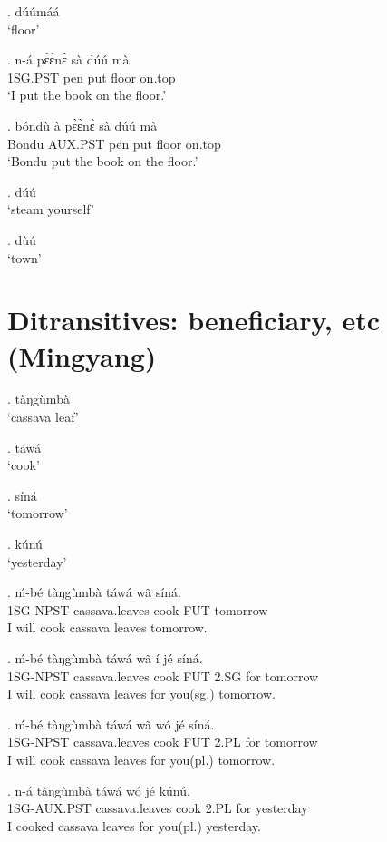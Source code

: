 \documentclass{assets/fieldnotes}
\begin{document}
\ex. dúúmáá \\
`floor'

\exg. n-á pɛ̀ɛ̀nɛ̀ sà dúú mà \\
1SG.PST pen put floor on.top \\
`I put the book on the floor.'

\exg. bóndù à pɛ̀ɛ̀nɛ̀ sà dúú mà \\
Bondu AUX.PST pen put floor on.top \\
`Bondu put the book on the floor.'

\ex. dúú \\
`steam yourself'

\ex. dùú \\
`town'



\section{Ditransitives: beneficiary, etc (Mingyang)} \label{Ditransitives: beneficiary, etc (Mingyang)} %
\ex. tàŋgùmbà\\
    `cassava leaf'

\ex. táwá\\
    `cook'

\ex. síná\\
    `tomorrow'

\ex. kúnú\\
    `yesterday'

\exg. ḿ-bé tàŋgùmbà táwá wã síná.\\
    1SG-NPST cassava.leaves cook FUT tomorrow\\
    I will cook cassava leaves tomorrow.

\exg. ḿ-bé tàŋgùmbà táwá wã í jé síná.\\
    1SG-NPST cassava.leaves cook FUT 2.SG for tomorrow\\
    I will cook cassava leaves for you(sg.) tomorrow.

\exg. ḿ-bé tàŋgùmbà táwá wã wó jé síná.\\
    1SG-NPST cassava.leaves cook FUT 2.PL for tomorrow\\
    I will cook cassava leaves for you(pl.) tomorrow.

\exg. n-á tàŋgùmbà táwá wó jé kúnú.\\
    1SG-AUX.PST cassava.leaves cook 2.PL for yesterday\\
    I cooked cassava leaves for you(pl.) yesterday.
\end{document}
